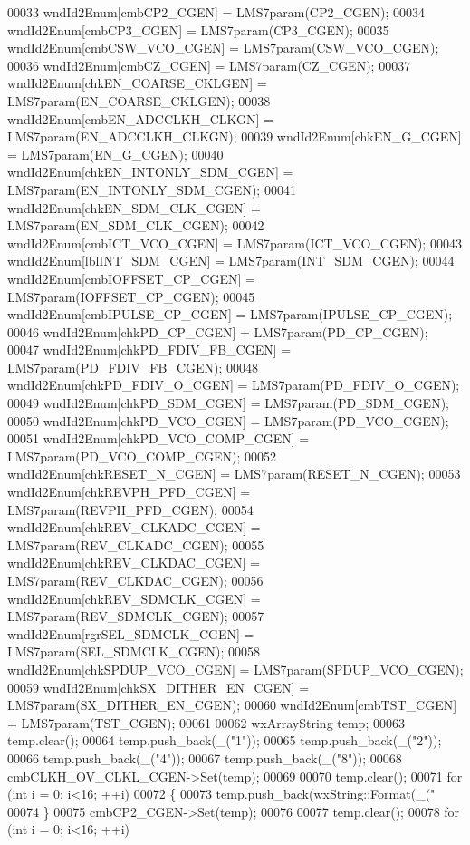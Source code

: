 \begin{DoxyCode}
00033     wndId2Enum[cmbCP2_CGEN] = LMS7param(CP2_CGEN);
00034     wndId2Enum[cmbCP3_CGEN] = LMS7param(CP3_CGEN);
00035     wndId2Enum[cmbCSW_VCO_CGEN] = LMS7param(CSW_VCO_CGEN);
00036     wndId2Enum[cmbCZ_CGEN] = LMS7param(CZ_CGEN);
00037     wndId2Enum[chkEN_COARSE_CKLGEN] = LMS7param(EN_COARSE_CKLGEN);
00038     wndId2Enum[cmbEN_ADCCLKH_CLKGN] = LMS7param(EN_ADCCLKH_CLKGN);
00039     wndId2Enum[chkEN_G_CGEN] = LMS7param(EN_G_CGEN);
00040     wndId2Enum[chkEN_INTONLY_SDM_CGEN] = LMS7param(EN_INTONLY_SDM_CGEN);
00041     wndId2Enum[chkEN_SDM_CLK_CGEN] = LMS7param(EN_SDM_CLK_CGEN);
00042     wndId2Enum[cmbICT_VCO_CGEN] = LMS7param(ICT_VCO_CGEN);
00043     wndId2Enum[lblINT_SDM_CGEN] = LMS7param(INT_SDM_CGEN);
00044     wndId2Enum[cmbIOFFSET_CP_CGEN] = LMS7param(IOFFSET_CP_CGEN);
00045     wndId2Enum[cmbIPULSE_CP_CGEN] = LMS7param(IPULSE_CP_CGEN);
00046     wndId2Enum[chkPD_CP_CGEN] = LMS7param(PD_CP_CGEN);
00047     wndId2Enum[chkPD_FDIV_FB_CGEN] = LMS7param(PD_FDIV_FB_CGEN);
00048     wndId2Enum[chkPD_FDIV_O_CGEN] = LMS7param(PD_FDIV_O_CGEN);
00049     wndId2Enum[chkPD_SDM_CGEN] = LMS7param(PD_SDM_CGEN);
00050     wndId2Enum[chkPD_VCO_CGEN] = LMS7param(PD_VCO_CGEN);
00051     wndId2Enum[chkPD_VCO_COMP_CGEN] = LMS7param(PD_VCO_COMP_CGEN);
00052     wndId2Enum[chkRESET_N_CGEN] = LMS7param(RESET_N_CGEN);
00053     wndId2Enum[chkREVPH_PFD_CGEN] = LMS7param(REVPH_PFD_CGEN);
00054     wndId2Enum[chkREV_CLKADC_CGEN] = LMS7param(REV_CLKADC_CGEN);
00055     wndId2Enum[chkREV_CLKDAC_CGEN] = LMS7param(REV_CLKDAC_CGEN);
00056     wndId2Enum[chkREV_SDMCLK_CGEN] = LMS7param(REV_SDMCLK_CGEN);
00057     wndId2Enum[rgrSEL_SDMCLK_CGEN] = LMS7param(SEL_SDMCLK_CGEN);
00058     wndId2Enum[chkSPDUP_VCO_CGEN] = LMS7param(SPDUP_VCO_CGEN);
00059     wndId2Enum[chkSX_DITHER_EN_CGEN] = LMS7param(SX_DITHER_EN_CGEN);
00060     wndId2Enum[cmbTST_CGEN] = LMS7param(TST_CGEN);
00061 
00062     wxArrayString temp;
00063     temp.clear();
00064     temp.push\_back(\_(\textcolor{stringliteral}{"1"}));
00065     temp.push\_back(\_(\textcolor{stringliteral}{"2"}));
00066     temp.push\_back(\_(\textcolor{stringliteral}{"4"}));
00067     temp.push\_back(\_(\textcolor{stringliteral}{"8"}));
00068     cmbCLKH_OV_CLKL_CGEN->Set(temp);
00069 
00070     temp.clear();
00071     \textcolor{keywordflow}{for} (\textcolor{keywordtype}{int} i = 0; i<16; ++i)
00072     \{
00073         temp.push\_back(wxString::Format(\_(\textcolor{stringliteral}{"%
00074     \}
00075     cmbCP2_CGEN->Set(temp);
00076 
00077     temp.clear();
00078     \textcolor{keywordflow}{for} (\textcolor{keywordtype}{int} i = 0; i<16; ++i)
}
\end{DoxyCode}
